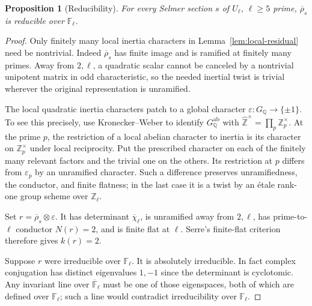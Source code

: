 \documentclass[11pt,a4paper]{article}
\newcommand{\Q}{\mathbb Q}
\newcommand{\Z}{\mathbb Z}
\newcommand{\F}{\mathbb F}
\newcommand{\Zhat}{\widehat{\Z}}
\newcommand{\eps}{\varepsilon}
\newcommand{\et}{\'et}
\newcommand{\ab}{\mathrm{ab}}
\theoremstyle{plain}
\newtheorem{proposition}[theorem]{Proposition}
\theoremstyle{definition}
\begin{document}
\begin{proposition}[Reducibility]\label{prop:reducible}
For every Selmer section $s$ of $U_\ell$, $\ell\geq5$ prime,
$\overline\rho_s$ is reducible over $\F_\ell$.
\end{proposition}
\begin{proof}
Only finitely many local inertia characters in
Lemma~\ref{lem:local-residual} need be nontrivial. Indeed
$\overline\rho_s$ has finite image and is ramified at finitely many
primes. Away from $2,\ell$, a quadratic scalar cannot be canceled by
a nontrivial unipotent matrix in odd characteristic, so the needed
inertial twist is trivial wherever the original representation is
unramified.

The local quadratic inertia characters patch to a global character
$\eps:G_\Q\to\{\pm1\}$. To see this precisely, use
Kronecker--Weber to identify $G_\Q^{\ab}$ with
$\Zhat^\times=\prod_p\Z_p^\times$. At the prime $p$, the restriction
of a local abelian character to inertia is its character on
$\Z_p^\times$ under local reciprocity. Put the prescribed character
on each of the finitely many relevant factors and the trivial one on
the others. Its restriction at $p$ differs from $\eps_p$ by an
unramified character. Such a difference preserves unramifiedness,
the conductor, and finite flatness; in the last case it is a twist by
an \et ale rank-one group scheme over $\Z_\ell$.

Set $r=\overline\rho_s\otimes\eps$. It has determinant
$\overline\chi_\ell$, is unramified away from $2,\ell$, has
prime-to-$\ell$ conductor $N(r)=2$, and is finite flat at $\ell$.
Serre's finite-flat criterion
\citep[\S2.8, Proposition~4, pp.~189--190]{serre} therefore gives $k(r)=2$.

Suppose $r$ were irreducible over $\F_\ell$. It is absolutely
irreducible. In fact complex conjugation has distinct eigenvalues
$1,-1$ since the determinant is cyclotomic. Any invariant line over
$\overline{\F}_\ell$ must be one of those eigenspaces, both of which
are defined over $\F_\ell$; such a line would contradict
irreducibility over $\F_\ell$.


\end{proof}
\end{document}
